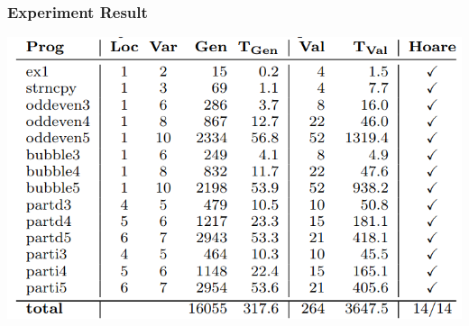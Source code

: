 \documentclass[11pt]{beamer}
\begin{document}
\begin{frame}\frametitle{Experiment Result}
\begin{center}
\includegraphics[scale=0.4]{12.png}
\end{center}
\end{frame}
\end{document}
